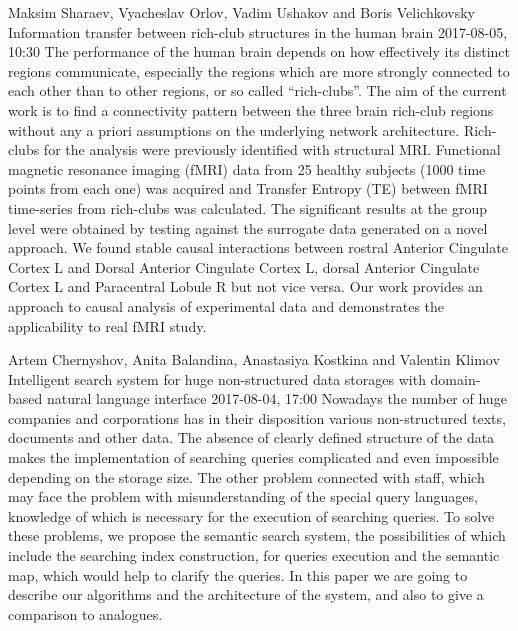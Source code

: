 \documentclass[10pt,fleqn,openany]{book} %
\begin{document}
\begin{enumerate}
		
		\paperabstract
		{Maksim Sharaev, Vyacheslav Orlov, Vadim Ushakov and Boris Velichkovsky}
		{Information transfer between rich-club structures in the human brain}
		{2017-08-05, 10:30}
		{The performance of the human brain depends on how effectively its distinct regions communicate, especially the regions which are more strongly connected to each other than to other regions, or so called ``rich-clubs''. The aim of the current work is to find a connectivity pattern between the three brain rich-club regions without any a priori assumptions on the underlying network architecture. Rich-clubs for the analysis were previously identified with structural MRI. Functional magnetic resonance imaging (fMRI) data from 25 healthy subjects (1000 time points from each one) was acquired and Transfer Entropy (TE) between fMRI time-series from rich-clubs was calculated. The significant results at the group level were obtained by testing against the surrogate data generated on a novel approach. We found stable causal interactions between rostral Anterior Cingulate Cortex L and Dorsal Anterior Cingulate Cortex L, dorsal Anterior Cingulate Cortex L and Paracentral Lobule R but not vice versa. Our work provides an approach to causal analysis of experimental data and demonstrates the applicability to real fMRI study.}
		
		
		\paperabstract
		{Artem Chernyshov, Anita Balandina, Anastasiya Kostkina and Valentin Klimov}
		{Intelligent search system for huge non-structured data storages with domain-based natural language interface}
		{2017-08-04, 17:00}
		{Nowadays the number of huge companies and corporations has in their disposition various non-structured texts, documents and other data. The absence of clearly defined structure of the data makes the implementation of searching queries complicated and even impossible depending on the storage size. The other problem connected with staff, which may face the problem with misunderstanding of the special query languages, knowledge of which is necessary for the execution of searching queries. To solve these problems, we propose the semantic search system, the possibilities of which include the searching index construction, for queries execution and the semantic map, which would help to clarify the queries. In this paper we are going to describe our algorithms and the architecture of the system, and also to give a comparison to analogues.}
		

\end{enumerate}
\end{document}
